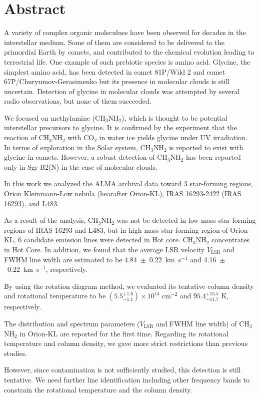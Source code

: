 \chapter*{Abstract}

\singlespacing

A variety of complex organic moleculues have been observed for decades in the interstellar medium.
Some of them are considered to be delivered to the primordial Earth by comets, 
and contributed to the chemical evolution leading to terrestrial life.
One example of such prebiotic species is amino acid. Glycine, the simplest amino acid, 
has been detected in comet 81P/Wild 2 and comet 67P/Churyumov-Gerasimenko but its presence in molecular clouds 
is still uncertain. Detection of glycine in molecular clouds was attempted by several radio observations, 
but none of them succeeded.

We focused on methylamine (CH$_3$NH$_2$), which is thought to be potential interstellar precursors to glycine. 
It is confirmed by the experiment that the reaction of CH$_3$NH$_2$ with CO$_2$ in water ice 
yields glycine under UV irradiation. 
In terms of exploration in the Solar system, CH$_3$NH$_2$ is reported to exist with glycine in comets. 
However, a robust detection of CH$_3$NH$_2$ has been reported only in Sgr B2(N) in the case of molecular clouds.

In this work we analyzed the ALMA archival data toward 3 star-forming regions, 
Orion Kleinmann-Low nebula (hearafter Orion-KL), IRAS 16293-2422 (IRAS 16293), and L483.

As a result of the analysis, CH$_3$NH$_2$ was not be detected in low mass star-forming regions of IRAS 16293 and L483, 
but in high mass star-forming region of Orion-KL, 6 candidate emission lines were detected in Hot core.
CH$_3$NH$_2$ concentrates in Hot Core. In addition, we found that the average LSR velocity $V_{\mathrm{LSR}}$ and FWHM line width are estimated to be 4.84~$\pm$~0.22~km~s$^{-1}$ 
and 4.16~$\pm$~0.22~km~s$^{-1}$, respectively. 

By using the rotation diagram method, we evaluated its tentative column density 
and rotational temperature to be $(5.5^{+1.6}_{-1.1} ) \times 10^{14}$ cm$^{-2}$ and $95.4^{+15.5}_{-11.7} \,\,\mathrm{K}$, respectively. 

The distribution and spectrum parameters ($V_{\mathrm{LSR}}$ and FWHM line width) of CH$_3$NH$_2$ in Orion-KL are reported for the first time.
Regarding its rotational temperature and column density, we gave more strict restrictions than previous studies.

However, since contamination is not sufficiently studied, this detection is still tentative.
We need further line identification including other frequency bands to constrain the rotational temperature and the column density.

\doublespacing